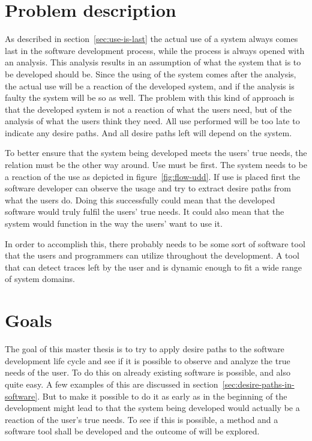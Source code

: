 \documentclass[a4paper]{report}
\begin{document}
\section{Problem description} \label{sec:problem-description}
As described in section~\ref{sec:use-is-last} the actual use of a system always comes last in the software development process, while the process is always opened with an analysis. This analysis results in an assumption of what the system that is to be developed should be. Since the using of the system comes after the analysis, the actual use will be a reaction of the developed system, and if the analysis is faulty the system will be so as well. The problem with this kind of approach is that the developed system is not a reaction of what the users need, but of the analysis of what the users think they need. All use performed will be too late to indicate any desire paths. And all desire paths left will depend on the system.

To better ensure that the system being developed meets the users' true needs, the relation must be the other way around. Use must be first. The system needs to be a reaction of the use as depicted in figure~\ref{fig:flow-udd}. If use is placed first the software developer can observe the usage and try to extract desire paths from what the users do. Doing this successfully could mean that the developed software would truly fulfil the users' true needs. It could also mean that the system would function in the way the users' want to use it. 

In order to accomplish this, there probably needs to be some sort of software tool that the users and programmers can utilize throughout the development. A tool that can detect traces left by the user and is dynamic enough to fit a wide range of system domains.

\section{Goals} \label{sec:goals}
The goal of this master thesis is to try to apply desire paths to the software development life cycle and see if it is possible to observe and analyze the true needs of the user. To do this on already existing software is possible, and also quite easy. A few examples of this are discussed in section~\ref{sec:desire-paths-in-software}. But to make it possible to do it as early as in the beginning of the development might lead to that the system being developed would actually be a reaction of the user's true needs. To see if this is possible, a method and a software tool shall be developed and the outcome of will be explored.
\end{document}
